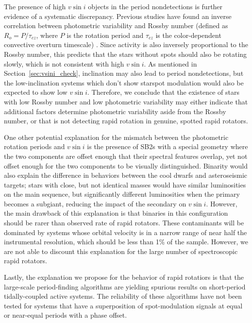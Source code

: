 \documentclass[manuscript]{aastex6}
\newcommand{\vsini}{\ensuremath{v \sin i}}
\begin{document}
The presence of high \vsini{} objects in the period nondetections is
further evidence of a systematic discrepancy. Previous studies have found an 
inverse correlation between photometric variability and Rossby number (defined 
as \(R_o = P / \tau_{cz}\), where \(P\) is the rotation period and 
\(\tau_{cz}\) is the color-dependent convective overturn timescale) 
\citep{Messina01,Hartman09}. Since activity is also inversely
proportional to the Rossby number, this predicts that the stars without
spots should also be rotating slowly, which is not consistent with high
\vsini{}. As mentioned in Section~\ref{sec:vsini_check}, inclination may
also lead to period nondetections, but the low-inclination systems which
don't show starspot modulation would also be expected to show low
\vsini{}. Therefore, we conclude that the existence of 
stars with low Rossby number and low photometric variability may either 
indicate that additional factors determine photometric variability 
aside from the Rossby number, or that \citet{McQuillan14} is not detecting 
rapid rotation in genuine, spotted rapid rotators.

One other potential explanation for the mismatch between the photometric
rotation periods and \vsini{} is the presence of SB2s with a special geometry
where the two components are offset enough that their spectral features
overlap, yet not offset enough for the two components to be visually
distinguished. Binarity would also explain the difference in behaviors
between the cool dwarfs and asteroseismic targets; stars with close, but
not identical masses would have similar luminosities on the main
sequence, but significantly different luminosities when the primary
becomes a subgiant, reducing the impact of the secondary on
\vsini{}. However, the main drawback of this explanation is that
binaries in this configuration should be rarer than observed rate of
rapid rotators. These contaminants will be dominated by systems whose
orbital velocity is in a narrow range of near half the instrumental
resolution, which should be less than 1\% of the sample. However, we are
not able to discount this explanation for the large number of
spectroscopic rapid rotators.

Lastly, the explanation we propose for the behavior of rapid rotatiors is that 
the large-scale period-finding algorithms are yielding
spurious results on short-period tidally-coupled active systems. The
reliability of these algorithms have not been tested for systems that
have a superposition of spot-modulation signals at equal or near-equal
periods with a phase offset. 
\end{document}
